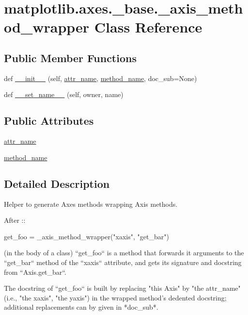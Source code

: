 \hypertarget{classmatplotlib_1_1axes_1_1__base_1_1__axis__method__wrapper}{}\section{matplotlib.\+axes.\+\_\+base.\+\_\+axis\+\_\+method\+\_\+wrapper Class Reference}
\label{classmatplotlib_1_1axes_1_1__base_1_1__axis__method__wrapper}
\subsection*{Public Member Functions}
\begin{DoxyCompactItemize}
\item 
def \hyperlink{classmatplotlib_1_1axes_1_1__base_1_1__axis__method__wrapper_aaf935d52d0ec0007cbaaa8d77b0ccaf3}{\+\_\+\+\_\+init\+\_\+\+\_\+} (self, \hyperlink{classmatplotlib_1_1axes_1_1__base_1_1__axis__method__wrapper_a6af479c9e9beb298055b1fd389ed2168}{attr\+\_\+name}, \hyperlink{classmatplotlib_1_1axes_1_1__base_1_1__axis__method__wrapper_aaa8da607ce4e7fbe20405f94215adc7a}{method\+\_\+name}, doc\+\_\+sub=None)
\item 
def \hyperlink{classmatplotlib_1_1axes_1_1__base_1_1__axis__method__wrapper_aa35c42b030bc2a941d198b24ad80ec7e}{\+\_\+\+\_\+set\+\_\+name\+\_\+\+\_\+} (self, owner, name)
\end{DoxyCompactItemize}
\subsection*{Public Attributes}
\begin{DoxyCompactItemize}
\item 
\hyperlink{classmatplotlib_1_1axes_1_1__base_1_1__axis__method__wrapper_a6af479c9e9beb298055b1fd389ed2168}{attr\+\_\+name}
\item 
\hyperlink{classmatplotlib_1_1axes_1_1__base_1_1__axis__method__wrapper_aaa8da607ce4e7fbe20405f94215adc7a}{method\+\_\+name}
\end{DoxyCompactItemize}


\subsection{Detailed Description}
\begin{DoxyVerb}Helper to generate Axes methods wrapping Axis methods.

After ::

    get_foo = _axis_method_wrapper("xaxis", "get_bar")

(in the body of a class) ``get_foo`` is a method that forwards it arguments
to the ``get_bar`` method of the ``xaxis`` attribute, and gets its
signature and docstring from ``Axis.get_bar``.

The docstring of ``get_foo`` is built by replacing "this Axis" by "the
{attr_name}" (i.e., "the xaxis", "the yaxis") in the wrapped method's
dedented docstring; additional replacements can by given in *doc_sub*.
\end{DoxyVerb}
 


